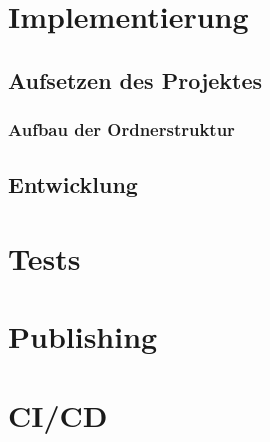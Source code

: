 \section{Implementierung}
\label{sec:EntwicklungIntelliJ_Implementierung}

\subsection{Aufsetzen des Projektes}

\subsubsection{Aufbau der Ordnerstruktur}

\subsection{Entwicklung}

\section{Tests}
\label{sec:EntwicklungIntelliJ_Tests}

\section{Publishing}
\label{sec:EntwicklungIntelliJ_Publishing}

\section{CI/CD}
\label{sec:EntwicklungIntelliJ_CICD}